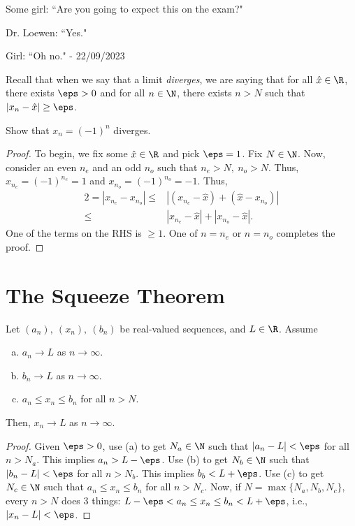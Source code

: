 \begin{nquote}{}
	Some girl: ``Are you going to expect this on the exam?"
	
	\smallskip
	
	Dr. Loewen: ``Yes."
	
	\smallskip
	
	Girl: ``Oh no." - 22/09/2023
\end{nquote}

Recall that when we say that a limit \emph{diverges}, we are saying that for all \(\hat{x}\in\R\), there exists \(\eps>0\) and for all \(n\in\N\), there exists \(n>N\) such that \(|x_n-\hat{x}|\geq\eps\).
\begin{example}
	Show that \(x_n=(-1)^n\) diverges.
\end{example}
\begin{proof}
	To begin, we fix some \(\hat{x}\in\R\) and pick \(\eps=1\). Fix \(N\in\N\). Now, consider an even \(n_e\) and an odd \(n_o\) such that \(n_e>N,~n_o>N\). Thus, \(x_{n_e}=(-1)^{n_e}=1\) and \(x_{n_o}=(-1)^{n_o}=-1\). Thus, 
	\begin{align*}
		2=|x_{n_e}-x_{n_o}|\leq&|(x_{n_e}-\hat{x})+(\hat{x}-x_{n_o})|\\
		\leq&|x_{n_e}-\hat{x}|+|x_{n_o}-\hat{x}|.
	\end{align*}
	One of the terms on the RHS is \(\geq 1\). One of \(n=n_e\) or \(n=n_o\) completes the proof.
\end{proof}

\clearpage

\section{The Squeeze Theorem}
Let \((a_n),~(x_n),~(b_n)\) be real-valued sequences, and \(L\in\R\). Assume
\begin{enumerate}[(a)]
	\item \(a_n\to L\) as \(n\to\infty\).
	
	\item \(b_n\to L\) as \(n\to\infty\).
	
	\item \(a_n\leq x_n\leq b_n\) for all \(n>N\).
\end{enumerate}
Then, \(x_n\to L\) as \(n\to\infty\).
\begin{proof}
	Given \(\eps>0\), use (a) to get \(N_a\in\N\) such that \(|a_n-L|<\eps\) for all \(n>N_a\). This implies \(a_n>L-\eps\). Use (b) to get \(N_b\in\N\) such that \(|b_n-L|<\eps\) for all \(n>N_b\). This implies \(b_b<L+\eps\). Use (c) to get \(N_c\in\N\) such that \(a_n\leq x_n\leq b_n\) for all \(n>N_c\). Now, if \(N=\operatorname{max}\{N_a,N_b,N_c\}\), every \(n>N\) does 3 things: \(L-\eps< a_n\leq x_n\leq b_n<L+\eps\), i.e., \(|x_n-L|<\eps\).
\end{proof}